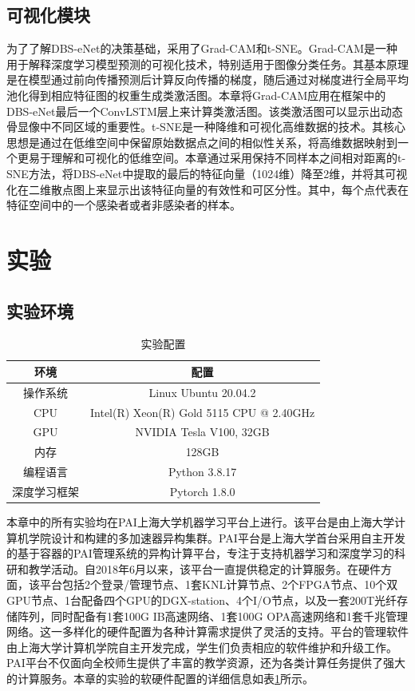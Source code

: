 \subsection{可视化模块}

为了了解DBS-eNet的决策基础，采用了Grad-CAM和t-SNE。Grad-CAM是一种用于解释深度学习模型预测的可视化技术，特别适用于图像分类任务。其基本原理是在模型通过前向传播预测后计算反向传播的梯度，随后通过对梯度进行全局平均池化得到相应特征图的权重生成类激活图。本章将Grad-CAM应用在框架中的DBS-eNet最后一个ConvLSTM层上来计算类激活图。该类激活图可以显示出动态骨显像中不同区域的重要性。t-SNE是一种降维和可视化高维数据的技术。其核心思想是通过在低维空间中保留原始数据点之间的相似性关系，将高维数据映射到一个更易于理解和可视化的低维空间。本章通过采用保持不同样本之间相对距离的t-SNE方法，将DBS-eNet中提取的最后的特征向量（1024维）降至2维，并将其可视化在二维散点图上来显示出该特征向量的有效性和可区分性。其中，每个点代表在特征空间中的一个感染者或者非感染者的样本。

\section{实验}

\subsection{实验环境}

\begin{table}[htbp]
  \centering
  \caption{实验配置}
  \begin{tabular}{cc}
    \toprule
    环境         & 配置                                     \\
    \midrule
    操作系统     & Linux Ubuntu 20.04.2                     \\
    CPU          & Intel(R) Xeon(R) Gold 5115 CPU @ 2.40GHz \\
    GPU          & NVIDIA Tesla V100, 32GB                  \\
    内存         & 128GB                                    \\
    编程语言     & Python 3.8.17                            \\
    深度学习框架 & Pytorch 1.8.0                            \\
    \bottomrule
  \end{tabular}
  \label{tab:chap03_experimental_config}
\end{table}

本章中的所有实验均在PAI上海大学机器学习平台上进行。该平台是由上海大学计算机学院设计和构建的多加速器异构集群。PAI平台是上海大学首台采用自主开发的基于容器的PAI管理系统的异构计算平台，专注于支持机器学习和深度学习的科研和教学活动。自2018年6月以来，该平台一直提供稳定的计算服务。在硬件方面，该平台包括2个登录/管理节点、1套KNL计算节点、2个FPGA节点、10个双GPU节点、1台配备四个GPU的DGX-station、4个I/O节点，以及一套200T光纤存储阵列，同时配备有1套100G IB高速网络、1套100G OPA高速网络和1套千兆管理网络。这一多样化的硬件配置为各种计算需求提供了灵活的支持。平台的管理软件由上海大学计算机学院自主开发完成，学生们负责相应的软件维护和升级工作。PAI平台不仅面向全校师生提供了丰富的教学资源，还为各类计算任务提供了强大的计算服务。本章的实验的软硬件配置的详细信息如表\ref{tab:chap03_experimental_config}所示。

